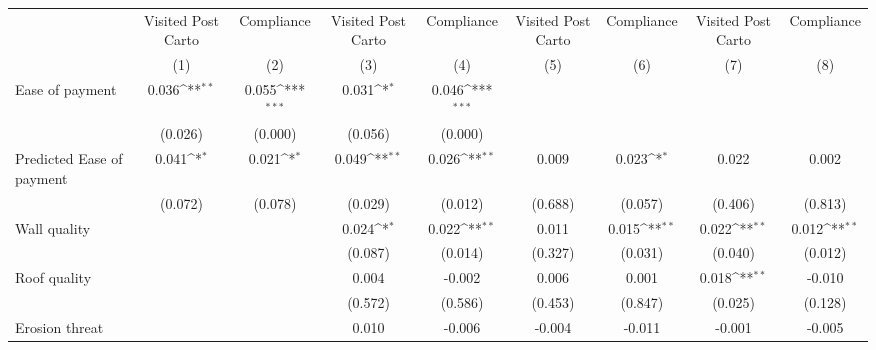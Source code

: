 {
\def\sym#1{\ifmmode^{#1}\else\(^{#1}\)\fi}
\begin{tabular}{l*{8}{c}}
\toprule
                &\multicolumn{1}{c}{Visited Post Carto}&\multicolumn{1}{c}{Compliance}&\multicolumn{1}{c}{Visited Post Carto}&\multicolumn{1}{c}{Compliance}&\multicolumn{1}{c}{Visited Post Carto}&\multicolumn{1}{c}{Compliance}&\multicolumn{1}{c}{Visited Post Carto}&\multicolumn{1}{c}{Compliance}\\
                &\multicolumn{1}{c}{(1)}         &\multicolumn{1}{c}{(2)}         &\multicolumn{1}{c}{(3)}         &\multicolumn{1}{c}{(4)}         &\multicolumn{1}{c}{(5)}         &\multicolumn{1}{c}{(6)}         &\multicolumn{1}{c}{(7)}         &\multicolumn{1}{c}{(8)}         \\
\midrule
Ease of payment &    0.036\sym{**} &    0.055\sym{***}&    0.031\sym{*}  &    0.046\sym{***}&                  &                  &                  &                  \\
                &  (0.026)         &  (0.000)         &  (0.056)         &  (0.000)         &                  &                  &                  &                  \\
Predicted Ease of payment&    0.041\sym{*}  &    0.021\sym{*}  &    0.049\sym{**} &    0.026\sym{**} &    0.009         &    0.023\sym{*}  &    0.022         &    0.002         \\
                &  (0.072)         &  (0.078)         &  (0.029)         &  (0.012)         &  (0.688)         &  (0.057)         &  (0.406)         &  (0.813)         \\
Wall quality    &                  &                  &    0.024\sym{*}  &    0.022\sym{**} &    0.011         &    0.015\sym{**} &    0.022\sym{**} &    0.012\sym{**} \\
                &                  &                  &  (0.087)         &  (0.014)         &  (0.327)         &  (0.031)         &  (0.040)         &  (0.012)         \\
Roof quality    &                  &                  &    0.004         &   -0.002         &    0.006         &    0.001         &    0.018\sym{**} &   -0.010         \\
                &                  &                  &  (0.572)         &  (0.586)         &  (0.453)         &  (0.847)         &  (0.025)         &  (0.128)         \\
Erosion threat  &                  &                  &    0.010         &   -0.006         &   -0.004         &   -0.011         &   -0.001         &   -0.005         \\

\end{tabular}}
